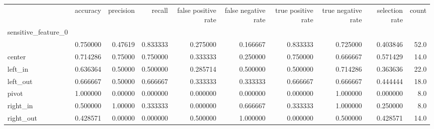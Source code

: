 \begin{tabular}{lrrrrrrrrr}
\toprule
{} &  accuracy &  precision &    recall &  false positive rate &  false negative rate &  true positive rate &  true negative rate &  selection rate &  count \\
sensitive\_feature\_0 &           &            &           &                      &                      &                     &                     &                 &        \\
\midrule
                    &  0.750000 &    0.47619 &  0.833333 &             0.275000 &             0.166667 &            0.833333 &            0.725000 &        0.403846 &   52.0 \\
center              &  0.714286 &    0.75000 &  0.750000 &             0.333333 &             0.250000 &            0.750000 &            0.666667 &        0.571429 &   14.0 \\
left\_in             &  0.636364 &    0.50000 &  0.500000 &             0.285714 &             0.500000 &            0.500000 &            0.714286 &        0.363636 &   22.0 \\
left\_out            &  0.666667 &    0.50000 &  0.666667 &             0.333333 &             0.333333 &            0.666667 &            0.666667 &        0.444444 &   18.0 \\
pivot               &  1.000000 &    0.00000 &  0.000000 &             0.000000 &             0.000000 &            0.000000 &            1.000000 &        0.000000 &    8.0 \\
right\_in            &  0.500000 &    1.00000 &  0.333333 &             0.000000 &             0.666667 &            0.333333 &            1.000000 &        0.250000 &    8.0 \\
right\_out           &  0.428571 &    0.00000 &  0.000000 &             0.500000 &             1.000000 &            0.000000 &            0.500000 &        0.428571 &   14.0 \\
\bottomrule
\end{tabular}
